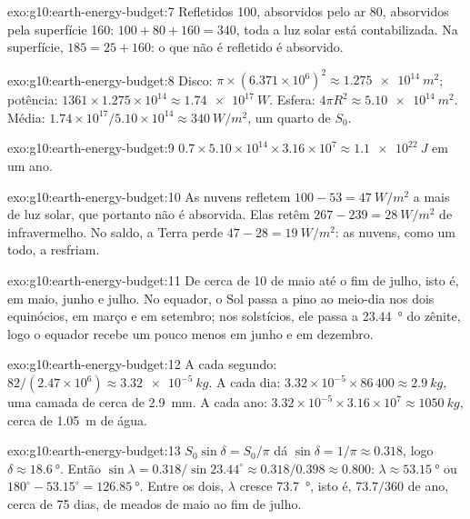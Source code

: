 \begin{solution}{exo:g10:earth-energy-budget:7}
Refletidos 100, absorvidos pelo ar 80, absorvidos pela superfície 160:
$100 + 80 + 160 = 340$, toda a luz solar está contabilizada. Na superfície,
$185 = 25 + 160$: o que não é refletido é absorvido.
\end{solution}

\begin{solution}{exo:g10:earth-energy-budget:8}
Disco: $\pi \times (6.371\times10^6)^2 \approx \qty{1.275e14}{m^2}$;
potência: $1361 \times 1.275\times10^{14} \approx \qty{1.74e17}{W}$.
Esfera: $4\pi
R^2 \approx \qty{5.10e14}{m^2}$. Média: $1.74\times10^{17}/5.10\times
10^{14} \approx \qty{340}{W/m^2}$, um quarto de $S_0$.
\end{solution}

\begin{solution}{exo:g10:earth-energy-budget:9}
$0.7 \times 5.10\times10^{14} \times 3.16\times10^7 \approx
\qty{1.1e22}{J}$ em um ano.
\end{solution}

\begin{solution}{exo:g10:earth-energy-budget:10}
As nuvens refletem $100 - 53 = \qty{47}{W/m^2}$ a mais de luz solar, que
portanto não é absorvida. Elas retêm $267 - 239 = \qty{28}{W/m^2}$ de
infravermelho. No saldo, a Terra perde $47 - 28 = \qty{19}{W/m^2}$: as
nuvens, como um todo, a resfriam.
\end{solution}

\begin{solution}{exo:g10:earth-energy-budget:11}
De cerca de 10 de maio até o fim de julho, isto é, em maio, junho e julho.
No equador, o Sol passa a pino ao meio-dia nos dois equinócios, em março e
em setembro; nos solstícios, ele passa a \qty{23.44}{\degree} do zênite,
logo o equador recebe um pouco menos em junho e em dezembro.
\end{solution}

\begin{solution}{exo:g10:earth-energy-budget:12}
A cada segundo: $82/(2.47\times10^6) \approx \qty{3.32e-5}{kg}$. A cada dia:
$3.32\times10^{-5} \times 86\,400 \approx \qty{2.9}{kg}$, uma camada de
cerca de \qty{2.9}{mm}. A cada ano: $3.32\times10^{-5} \times 3.16\times10^7 \approx
\qty{1050}{kg}$, cerca de \qty{1.05}{m} de água.
\end{solution}

\begin{solution}{exo:g10:earth-energy-budget:13}
$S_0 \sin\delta = S_0/\pi$ dá $\sin\delta = 1/\pi \approx 0.318$, logo
$\delta \approx \qty{18.6}{\degree}$. Então $\sin\lambda = 0.318/\sin 23.44^\circ
\approx 0.318/0.398 \approx 0.800$: $\lambda \approx \qty{53.15}{\degree}$ ou
$180^\circ - 53.15^\circ = \qty{126.85}{\degree}$. Entre os dois, $\lambda$
cresce \qty{73.7}{\degree}, isto é, $73.7/360$ de ano, cerca de
\num{75} dias, de meados de maio ao fim de julho.
\end{solution}

